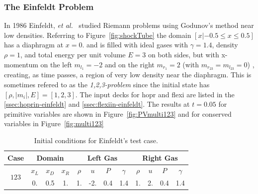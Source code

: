 
\subsubsection{The Einfeldt Problem}\label{ss:einfeldt}

In 1986  Einfeldt, \textit{et al.}~\cite{einfeldt}  studied Riemann problems using Godunov's method near low densities. Referring to Figure~\ref{fig:shockTube} the domain  $[x |  -0.5 \le x \le 0.5]$ has  a diaphragm at $x = 0.$ and is filled with ideal gases with $\gamma = 1.4$, density $\rho = 1$, and total energy per unit volume $E = 3$ on both sides, but with x-momentum on the left $m_{l_1} = -2$ and on the right $m_{r_1} = 2$ (with $m_{r_{23}} = m_{l_{23}} = 0$) , creating, as time passes, a region of very low density near the diaphragm.  This is sometimes refered to as the \textit{1,2,3-problem} since the initial state has $[\rho, |m_i|, E] = [1, 2, 3].$ The input decks for hopr and flexi are listed in the \ref{ssec:hoprin-einfeldt} and \ref{ssec:flexiin-einfeldt}.  The results at $t = 0.05$ for primitive variables are shown in Figure~\ref{fig:PVmulti123} and for conserved variables in Figure~\ref{fig:multi123}

\begin{table}[h!]
 \begin{center}
  \caption{Initial conditions for Einfeldt's test case.}
  \label{tab:einfeldtIC}
  \begin{tabular}{|c|ccc|cccc|cccc|} \hline
   \textbf{Case} & \multicolumn{3}{c|}{\textbf{Domain}} & \multicolumn{4}{c|}{\textbf{Left Gas}} & \multicolumn{4}{c|}{\textbf{Right Gas}} \\ \hline
   \multirow{2}{*}{$123$} & $x_L$ & $x_D$ & $x_R$ & $\rho$ & $u$ & $P$ & $\gamma$ & $\rho$ & $u$ & $P$ & $\gamma$ \\ \cline{2-12}
   \multicolumn{1}{|c|}{} & 0. & 0.5 & 1.  & 1. & -2. & 0.4 & 1.4 & 1. & 2. & 0.4 & 1.4 \\ \hline
  \end{tabular}
 \end{center}
\end{table}

